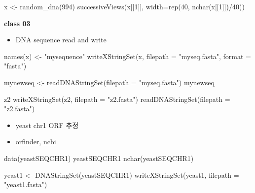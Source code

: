 \documentclass[
]{book}
\newenvironment{Shaded}{\begin{snugshade}}{\end{snugshade}}
\newcommand{\AttributeTok}[1]{\textcolor[rgb]{0.77,0.63,0.00}{#1}}
\newcommand{\DecValTok}[1]{\textcolor[rgb]{0.00,0.00,0.81}{#1}}
\newcommand{\FunctionTok}[1]{\textcolor[rgb]{0.00,0.00,0.00}{#1}}
\newcommand{\NormalTok}[1]{#1}
\newcommand{\OtherTok}[1]{\textcolor[rgb]{0.56,0.35,0.01}{#1}}
\newcommand{\SpecialCharTok}[1]{\textcolor[rgb]{0.00,0.00,0.00}{#1}}
\newcommand{\StringTok}[1]{\textcolor[rgb]{0.31,0.60,0.02}{#1}}
\providecommand{\tightlist}{%
  \setlength{\itemsep}{0pt}\setlength{\parskip}{0pt}}
\begin{document}
\begin{Shaded}
\begin{Highlighting}[]
\NormalTok{x }\OtherTok{\textless{}{-}} \FunctionTok{random\_dna}\NormalTok{(}\DecValTok{994}\NormalTok{)}
\FunctionTok{successiveViews}\NormalTok{(x[[}\DecValTok{1}\NormalTok{]], }\AttributeTok{width=}\FunctionTok{rep}\NormalTok{(}\DecValTok{40}\NormalTok{, }\FunctionTok{nchar}\NormalTok{(x[[}\DecValTok{1}\NormalTok{]])}\SpecialCharTok{/}\DecValTok{40}\NormalTok{))}
\end{Highlighting}
\end{Shaded}

\textbf{class 03}

\begin{itemize}
\tightlist
\item
  DNA sequence read and write
\end{itemize}

\begin{Shaded}
\begin{Highlighting}[]
\FunctionTok{names}\NormalTok{(x) }\OtherTok{\textless{}{-}} \StringTok{"mysequence"}
\FunctionTok{writeXStringSet}\NormalTok{(x, }\AttributeTok{filepath =} \StringTok{"myseq.fasta"}\NormalTok{, }\AttributeTok{format =} \StringTok{"fasta"}\NormalTok{)}

\NormalTok{mynewseq }\OtherTok{\textless{}{-}} \FunctionTok{readDNAStringSet}\NormalTok{(}\AttributeTok{filepath =} \StringTok{"myseq.fasta"}\NormalTok{)}
\NormalTok{mynewseq}

\NormalTok{z2}
\FunctionTok{writeXStringSet}\NormalTok{(z2, }\AttributeTok{filepath =} \StringTok{"z2.fasta"}\NormalTok{)}
\FunctionTok{readDNAStringSet}\NormalTok{(}\AttributeTok{filepath =} \StringTok{"z2.fasta"}\NormalTok{)}
\end{Highlighting}
\end{Shaded}

\begin{itemize}
\tightlist
\item
  yeast chr1 ORF 추정
\item
  \href{https://www.ncbi.nlm.nih.gov/orffinder/}{orfinder, ncbi}
\end{itemize}

\begin{Shaded}
\begin{Highlighting}[]
\FunctionTok{data}\NormalTok{(yeastSEQCHR1)}
\NormalTok{yeastSEQCHR1}
\FunctionTok{nchar}\NormalTok{(yeastSEQCHR1)}

\NormalTok{yeast1 }\OtherTok{\textless{}{-}} \FunctionTok{DNAStringSet}\NormalTok{(yeastSEQCHR1)}
\FunctionTok{writeXStringSet}\NormalTok{(yeast1, }\AttributeTok{filepath =} \StringTok{"yeast1.fasta"}\NormalTok{)}
\end{Highlighting}
\end{Shaded}
\end{document}
